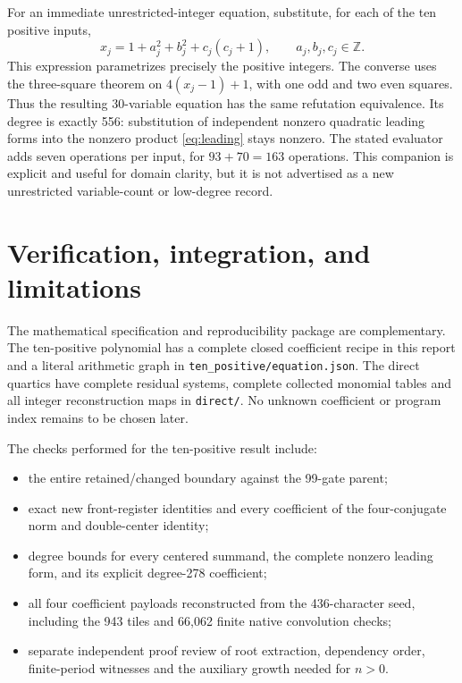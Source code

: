 \documentclass[11pt]{article}
\theoremstyle{remark}\newtheorem{remark}[theorem]{Remark}
\newcommand{\Z}{\mathbb Z}
\newcommand{\file}[1]{{\small\nolinkurl{#1}}}
\begin{document}
For an immediate unrestricted-integer equation, substitute, for each of
the ten positive inputs,
\begin{equation}\label{eq:legendre}
x_j=1+a_j^2+b_j^2+c_j(c_j+1),\qquad a_j,b_j,c_j\in\Z.
\end{equation}
This expression parametrizes precisely the positive integers. The converse
uses the three-square theorem on $4(x_j-1)+1$, with one odd and two even
squares. Thus the resulting 30-variable equation has the same refutation
equivalence. Its degree is exactly 556: substitution of independent
nonzero quadratic leading forms into the nonzero product
\eqref{eq:leading} stays nonzero. The stated evaluator adds seven operations
per input, for $93+70=163$ operations. This companion is explicit and
useful for domain clarity, but it is not advertised as a new unrestricted
variable-count or low-degree record.



\section{Verification, integration, and limitations}

The mathematical specification and reproducibility package are complementary.
The ten-positive polynomial has a complete closed coefficient recipe in
this report and a literal arithmetic graph in \file{ten_positive/equation.json}.
The direct quartics have complete residual systems, complete collected
monomial tables and all integer reconstruction maps in \file{direct/}.
No unknown coefficient or program index remains to be chosen later.

The checks performed for the ten-positive result include:
\begin{itemize}
\item the entire retained/changed boundary against the 99-gate parent;
\item exact new front-register identities and every coefficient of the
four-conjugate norm and double-center identity;
\item degree bounds for every centered summand, the complete nonzero leading
form, and its explicit degree-278 coefficient;
\item all four coefficient payloads reconstructed from the 436-character
seed, including the 943 tiles and 66,062 finite native convolution checks;
\item separate independent proof review of root extraction, dependency order,
finite-period witnesses and the auxiliary growth needed for $n>0$.
\end{itemize}
\end{document}
